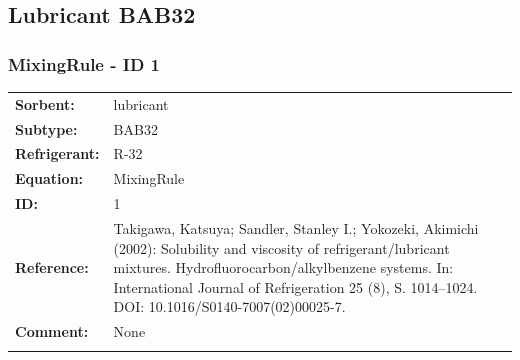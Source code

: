 \subsection{Lubricant BAB32}
%
\subsubsection{MixingRule - ID 1}
%
\begin{tabular}[l]{|lp{11.5cm}|}
\hline
\addlinespace

\textbf{Sorbent:} & lubricant \\
\textbf{Subtype:} & BAB32 \\
\textbf{Refrigerant:} & R-32 \\
\textbf{Equation:} & MixingRule \\
\textbf{ID:} & 1 \\
\textbf{Reference:} & Takigawa, Katsuya; Sandler, Stanley I.; Yokozeki, Akimichi (2002): Solubility and viscosity of refrigerant/lubricant mixtures. Hydrofluorocarbon/alkylbenzene systems. In: International Journal of Refrigeration 25 (8), S. 1014–1024. DOI: 10.1016/S0140-7007(02)00025-7. \\
\textbf{Comment:} & None \\

\addlinespace
\hline
\end{tabular}
\newline

